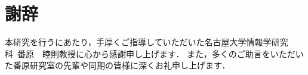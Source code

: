 \chapter*{謝辞}

本研究を行うにあたり，手厚くご指導していただいた名古屋大学情報学研究科~番原~~睦則教授に心から感謝申し上げます．
また，多くのご助言をいただいた番原研究室の先輩や同期の皆様に深くお礼申し上げます．


